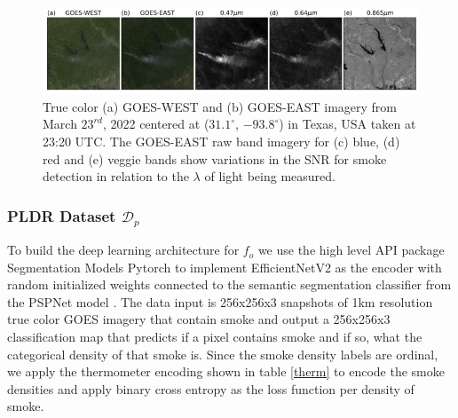 \documentclass{article}
\begin{document}
\begin{figure}[!htb]
    \centering
    \includegraphics[width=\linewidth]{figures/GOES_WEST_EAST_B_R_V_small.png}
    \caption{True color (a) GOES-WEST and (b) GOES-EAST imagery from March \(23^{rd}\), 2022 centered at (\(31.1^{\circ}\), \(-93.8^{\circ}\)) in Texas, USA taken at 23:20 UTC. The GOES-EAST raw band imagery for (c) blue, (d) red and (e) veggie bands show variations in the SNR for smoke detection in relation to the \(\lambda\) of light being measured.}\label{WEST_EAST_bands}
\end{figure}

\subsubsection{PLDR Dataset \(\mathcal{D}_p\)} 

To build the deep learning architecture for \(f_o\) we use the high level API package Segmentation Models Pytorch \cite{semantic} to implement EfficientNetV2 \cite{efficientnetv2} as the encoder with random initialized weights connected to the semantic segmentation classifier from the PSPNet model \cite{pspnet}. The data input is 256x256x3 snapshots of 1km resolution true color GOES imagery that contain smoke and output a 256x256x3 classification map that predicts if a pixel contains smoke and if so, what the categorical density of that smoke is. Since the smoke density labels are ordinal, we apply the thermometer encoding shown in table \ref{therm} to encode the smoke densities and apply binary cross entropy as the loss function per density of smoke. 
\end{document}

